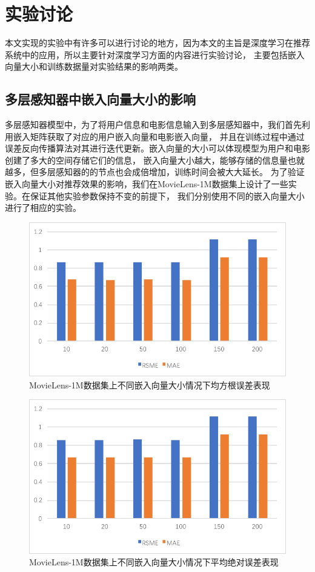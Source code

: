 \section{实验讨论}
本文实现的实验中有许多可以进行讨论的地方，因为本文的主旨是深度学习在推荐系统中的应用，所以主要针对深度学习方面的内容进行实验讨论，
主要包括嵌入向量大小和训练数据量对实验结果的影响两类。

\subsection{多层感知器中嵌入向量大小的影响}
多层感知器模型中，为了将用户信息和电影信息输入到多层感知器中，我们首先利用嵌入矩阵获取了对应的用户嵌入向量和电影嵌入向量，
并且在训练过程中通过误差反向传播算法对其进行迭代更新。嵌入向量的大小可以体现模型为用户和电影创建了多大的空间存储它们的信息，
嵌入向量大小越大，能够存储的信息量也就越多，但多层感知器的的节点也会成倍增加，训练时间会被大大延长。
为了验证嵌入向量大小对推荐效果的影响，我们在MovieLens-1M数据集上设计了一些实验。在保证其他实验参数保持不变的前提下，
我们分别使用不同的嵌入向量大小进行了相应的实验。

\begin{figure}[htbp]
    \centering
    \includegraphics[scale=0.7]{images/UM.pdf}
    \caption{MovieLens-1M数据集上不同嵌入向量大小情况下均方根误差表现}
    \label{fig:um}
\end{figure}

\begin{figure}[htbp]
    \centering
    \includegraphics[scale=0.7]{images/U_M.pdf}
    \caption{MovieLens-1M数据集上不同嵌入向量大小情况下平均绝对误差表现}
    \label{fig:u_m}
\end{figure}


